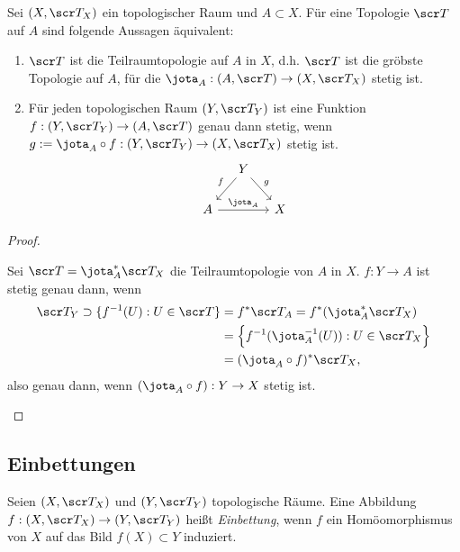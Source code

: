 \begin{st}
	Sei $(X, \scr T_X)$ ein topologischer Raum und $A \subset X$.
	Für eine Topologie $\scr T$ auf $A$ sind folgende Aussagen äquivalent:
	\begin{enumerate}[(1)]
		\item
			$\scr T$ ist die Teilraumtopologie auf $A$ in $X$, d.h. $\scr T$ ist die gröbste Topologie auf $A$, für die $\jota_A : (A, \scr T) \to (X, \scr T_X)$ stetig ist.
		\item
			Für jeden topologischen Raum $(Y, \scr T_Y)$ ist eine Funktion $f: (Y, \scr T_Y) \to (A, \scr T)$ genau dann stetig, wenn $g := \jota_A \circ f: (Y, \scr T_Y) \to (X, \scr T_X)$ stetig ist.
			\[
				\begin{tikzcd}[column sep=small]
					~& Y \arrow{dl}[swap]{f} \arrow{dr}{g} & \\
					A \arrow{rr}{\jota_A} & & X
				\end{tikzcd}
			\]
	\end{enumerate}
	\begin{proof}
		\begin{segnb}[„$\implies$“]
			Sei $\scr T = \jota_A^* \scr T_X$ die Teilraumtopologie von $A$ in $X$.
			$f: Y \to A$ ist stetig genau dann, wenn
			\begin{align*}
				\scr T_Y \supset \{ f^{-1}(U) : U \in \scr T \}
				&= f^* \scr T_A
				= f^*(\jota_A^* \scr T_X) \\
				&= \Big\{ f^{-1}(\jota_A^{-1}(U)) : U \in \scr T_X \Big\} \\
				&= (\jota_A \circ f)^* \scr T_X,
			\end{align*}
			also genau dann, wenn $(\jota_A \circ f): Y \to X$ stetig ist.
		\end{segnb}
	\end{proof}
\end{st}

\subsection{Einbettungen}

\begin{df} \label{df:embedding}
	Seien $(X,\scr T_X)$ und $(Y, \scr T_Y)$ topologische Räume.
	Eine Abbildung $f: (X, \scr T_X) \to (Y, \scr T_Y)$ heißt \emph{Einbettung}, wenn $f$ ein Homöomorphismus von $X$ auf das Bild $f(X) \subset Y$ induziert.
\end{df}

